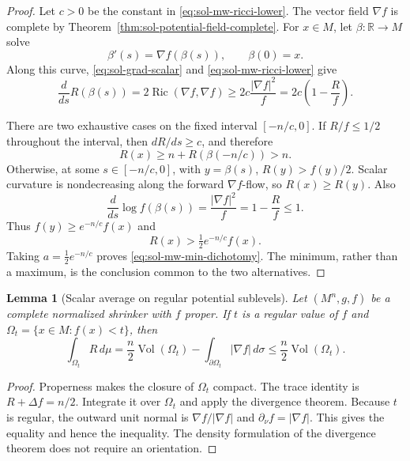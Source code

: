 \documentclass[10pt]{coll-l}
\newtheorem{lemma}[theorem]{Lemma}
\theoremstyle{definition}
\theoremstyle{remark}
\numberwithin{section}{chapter}
\numberwithin{equation}{chapter}
\newcommand{\Ric}{\operatorname{Ric}}
\newcommand{\Vol}{\operatorname{Vol}}
\begin{document}
\begin{proof}
Let $c>0$ be the constant in \eqref{eq:sol-mw-ricci-lower}.  The vector
field $\nabla f$ is complete by
Theorem~\ref{thm:sol-potential-field-complete}.  For $x\in M$, let
$\beta:\mathbb R\to M$ solve
\[
              \beta'(s)=\nabla f(\beta(s)),\qquad\beta(0)=x.
\]
Along this curve, \eqref{eq:sol-grad-scalar} and
\eqref{eq:sol-mw-ricci-lower} give
\begin{equation}
 \frac d{ds}R(\beta(s))
  =2\Ric(\nabla f,\nabla f)
  \geq2c\frac{|\nabla f|^2}{f}
  =2c\left(1-\frac Rf\right).                            \label{eq:sol-mw-orbit-R}
\end{equation}

There are two exhaustive cases on the fixed interval $[-n/c,0]$.  If
$R/f\leq1/2$ throughout the interval, then
$dR/ds\geq c$, and therefore
\[
              R(x)\geq n+R(\beta(-n/c))>n.
\]
Otherwise, at some $s\in[-n/c,0]$, with $y=\beta(s)$,
$R(y)>f(y)/2$.  Scalar curvature is nondecreasing along the forward
$\nabla f$-flow, so $R(x)\geq R(y)$.  Also
\[
 \frac d{ds}\log f(\beta(s))
   =\frac{|\nabla f|^2}{f}=1-\frac Rf\leq1.
\]
Thus $f(y)\geq e^{-n/c}f(x)$ and
\[
                  R(x)>\tfrac12e^{-n/c}f(x).
\]
Taking $a=\tfrac12e^{-n/c}$ proves
\eqref{eq:sol-mw-min-dichotomy}.  The minimum, rather than a maximum, is
the conclusion common to the two alternatives.
\end{proof}

\begin{lemma}[Scalar average on regular potential sublevels]
\label{lem:sol-sublevel-scalar-average}
Let $(M^n,g,f)$ be a complete normalized shrinker with $f$ proper.  If
$t$ is a regular value of $f$ and
$\Omega_t=\{x\in M:f(x)<t\}$, then
\begin{equation}
 \int_{\Omega_t}R\,d\mu
  =\frac n2\Vol(\Omega_t)
      -\int_{\partial\Omega_t}|\nabla f|\,d\sigma
  \leq\frac n2\Vol(\Omega_t).                            \label{eq:sol-sublevel-average}
\end{equation}
\end{lemma}

\begin{proof}
Properness makes the closure of $\Omega_t$ compact.  The trace identity is
$R+\Delta f=n/2$.  Integrate it over $\Omega_t$ and apply the divergence
theorem.  Because $t$ is regular, the outward unit normal is
$\nabla f/|\nabla f|$ and $\partial_\nu f=|\nabla f|$.  This gives the
equality and hence the inequality.  The density formulation of the
divergence theorem does not require an orientation.
\end{proof}
\end{document}
